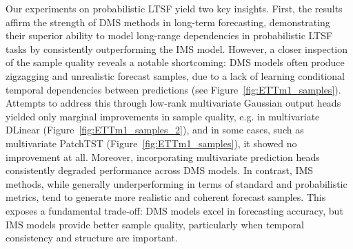 \documentclass[a4paper,oneside,bibliography=totoc]{scrbook}
\begin{document}
%
%
Our experiments on probabilistic LTSF yield two key insights.
First, the results affirm the strength of DMS methods in long-term forecasting, demonstrating their superior ability to model long-range dependencies in probabilistic LTSF tasks by consistently outperforming the IMS model.
However, a closer inspection of the sample quality reveals a notable shortcoming: DMS models often produce zigzagging and unrealistic forecast samples, due to a lack of learning conditional temporal dependencies between predictions (see Figure~\ref{fig:ETTm1_samples}). Attempts to address this through low-rank multivariate Gaussian output heads yielded only marginal improvements in sample quality, e.g. in multivariate DLinear (Figure~\ref{fig:ETTm1_samples_2}), and in some cases, such as multivariate PatchTST (Figure~\ref{fig:ETTm1_samples}), it showed no improvement at all. 
Moreover, incorporating multivariate prediction heads consistently degraded performance across DMS models.
In contrast, IMS methods, while generally underperforming in terms of standard and probabilistic metrics, tend to generate more realistic and coherent forecast samples. 
This exposes a fundamental trade-off: DMS models excel in forecasting accuracy, but IMS models provide better sample quality, particularly when temporal consistency and structure are important.
\end{document}
